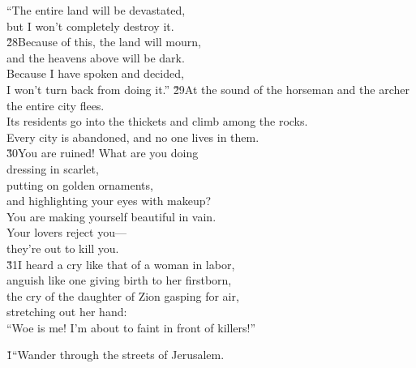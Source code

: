 \begin{poetry}
\poeml ``The entire land will be devastated, \\
\poemll    but I won't completely destroy it. \\
\poeml \v{28}Because of this, the land will mourn, \\
\poemll    and the heavens above will be dark. \\
\poeml Because I have spoken and decided, \\
\poemll    I won't turn back from doing it.''
\poeml \v{29}At the sound of the horseman and the archer \\
\poemll    the entire city flees. \\
\poeml Its residents go into the thickets and climb among the rocks. \\
\poemll    Every city is abandoned, and no one lives in them. \\
\poeml \v{30}You are ruined! What are you doing \\
\poemll    dressing in scarlet, \\
\poeml putting on golden ornaments, \\
\poemll    and highlighting your eyes with makeup? \\
\poeml You are making yourself beautiful in vain. \\
\poemll    Your lovers reject you--- \\
\poemlll       they're out to kill you. \\
\poeml \v{31}I heard a cry like that of a woman in labor, \\
\poemll    anguish like one giving birth to her firstborn, \\
\poeml the cry of the daughter of Zion gasping for air, \\
\poemll    stretching out her hand: \\
\poemll    ``Woe is me! I'm about to faint in front of killers!''
\end{poetry}

\v{1}``Wander through the streets of Jerusalem.

